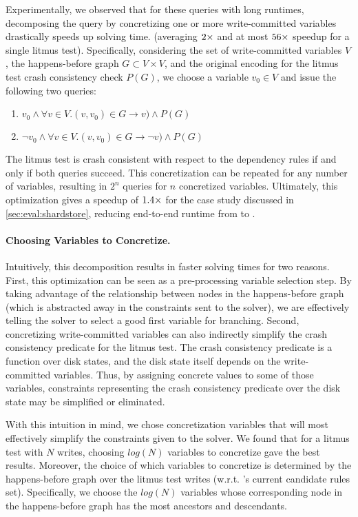 Experimentally, we observed that for these queries with long runtimes,
decomposing the query by concretizing one or more write-committed variables
drastically speeds up solving time.
(averaging $2 \times$ and at most $56 \times$ speedup for a single litmus test).
Specifically, considering the set of write-committed variables $V$,
the happens-before graph $G\subset V\times V$,
and the original encoding for the litmus test crash consistency check $P(G)$,
we choose a variable $v_0\in V$ and issue the following two queries:
\begin{enumerate}
  \item $v_0 \wedge \forall v\in V. (v, v_0)\in G \rightarrow v) \wedge P(G)$
  \item $\neg v_0 \wedge \forall v\in V. (v, v_0)\in G \rightarrow \neg v) \wedge P(G)$
\end{enumerate}
The litmus test is crash consistent with respect to the dependency rules
if and only if both queries succeed.
This concretization can be repeated for any number of variables,
resulting in $2^n$ queries for $n$ concretized variables.
Ultimately, this optimization gives a speedup of $1.4 \times$
for the \shardstore case study discussed in \cref{sec:eval:shardstore},
reducing end-to-end runtime from \shardstoresynthesistime to \splitvariablenewtime.

\paragraph{Choosing Variables to Concretize.}
Intuitively, this decomposition results in faster solving times for two reasons.
First, this optimization can be seen as a pre-processing variable selection step.
By taking advantage of the relationship between nodes in the happens-before graph
(which is abstracted away in the constraints sent to the solver),
we are effectively telling the solver to select a good first variable for branching.
Second, concretizing write-committed variables can also indirectly simplify the
crash consistency predicate for the litmus test.
The crash consistency predicate is a function over disk states,
and the disk state itself depends on the write-committed variables.
Thus, by assigning concrete values to some of those variables,
constraints representing the crash consistency predicate over the disk state
may be simplified or eliminated.

With this intuition in mind, we chose concretization variables
that will most effectively simplify the constraints given to the solver.
We found that for a litmus test with $N$ writes,
choosing $log(N)$ variables to concretize gave the best results.
Moreover, the choice of which variables to concretize is determined by the
happens-before graph over the litmus test writes
(w.r.t. \depsynth's current candidate rules set).
Specifically, we choose the $log(N)$ variables whose corresponding
node in the happens-before graph has the most ancestors and descendants.

